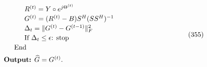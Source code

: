 \documentclass[12pt,a4paper]{article}
\begin{document}
\begin{equation}
{\begin{minipage}{0.72\linewidth}
\hspace*{3em}$R^{(t)}=Y\circ e^{j\Theta^{(t)}}$\\[2pt]
\hspace*{3em}$G^{(t)}=(R^{(t)}-B)S^H(SS^H)^{-1}$\\[2pt]
\hspace*{3em}$\Delta_t=\|G^{(t)}-G^{(t-1)}\|_F^2$\\[2pt]
\hspace*{3em}If $\Delta_t\leq\epsilon$: stop\\[2pt]
\hspace*{1.5em}End\\[6pt]
\textbf{Output:} $\widehat G=G^{(t)}$.
\vspace{4pt}
\end{minipage}}
\tag{355}
\end{equation}
\end{document}
